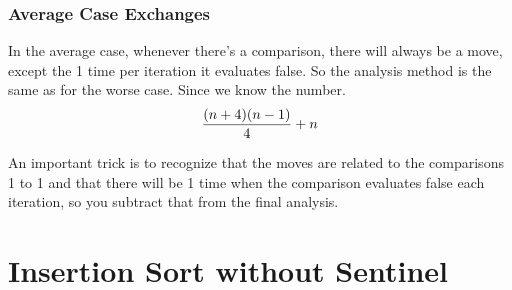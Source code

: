 \documentclass[english, 10pt]{article}
\begin{document}
\subsubsection{Average Case Exchanges}

In the average case, whenever there's a comparison, there will always be a
move, except the 1 time per iteration it evaluates false.  So the analysis
method is the same as for the worse case. Since we know the number.  $$\frac{(n+4)
(n-1)}{4} + n$$

\begin{rem}

An important trick is to recognize that the moves are related to the
comparisons 1 to 1 and that there will be 1 time when the comparison evaluates
false each iteration, so you subtract that from the final analysis.

\end{rem}



\section{Insertion Sort without Sentinel}
\end{document}
